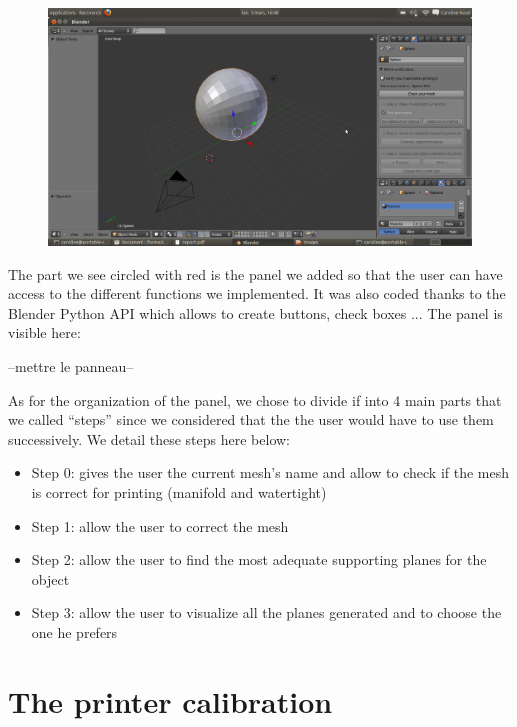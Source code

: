\documentclass{report}
\begin{document}
\bigskip

\begin{figure}[!h]
\begin{center}
	\includegraphics[scale=0.25]{NotreInterface}
\end{center}
\end{figure}

The part we see circled with red is the panel we added so that the user can have access to the different functions we implemented. It was also coded thanks to the Blender Python API which allows to create buttons, check boxes ... The panel is visible here:

\bigskip
--mettre le panneau--
\bigskip

As for the organization of the panel, we chose to divide if into 4 main parts that we called ``steps'' since we considered that the the user would have to use them successively. We detail these steps here below:

\begin{itemize}
\item Step 0: gives the user the current mesh's name and allow to check if the mesh is correct for printing (manifold and watertight)
\item Step 1: allow the user to correct the mesh
\item Step 2: allow the user to find the most adequate supporting planes for the object
\item Step 3: allow the user to visualize all the planes generated and to choose the one he prefers
\end{itemize}

\chapter{The printer calibration}
\end{document}
